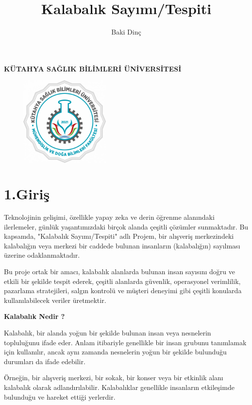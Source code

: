 \documentclass[10pt,a4paper]{report}
\title{Kalabalık Sayımı/Tespiti}
\author{Baki Dinç}
\begin{document}
	\textbf{KÜTAHYA SAĞLIK BİLİMLERİ ÜNİVERSİTESİ}\centering
	\begin{figure}[!h]
		\centering
		\includegraphics[width=170px, height=170px]{logomuh}
		\maketitle
	\end{figure}
	
		\newpage
		
			\raggedright\section*{1.Giriş}
		Teknolojinin gelişimi, özellikle yapay zeka ve derin öğrenme alanındaki ilerlemeler, günlük yaşantımızdaki birçok alanda çeşitli çözümler sunmaktadır. Bu kapsamda, "Kalabalık Sayımı/Tespiti" adlı Projem, bir alışveriş merkezindeki kalabalığın veya merkezi bir caddede bulunan insanların (kalabalığın) sayılması üzerine odaklanmaktadır.\newline
		
		
		
		Bu proje ortak bir amacı, kalabalık alanlarda bulunan insan sayısını doğru ve etkili bir şekilde tespit ederek, çeşitli alanlarda güvenlik, operasyonel verimlilik, pazarlama stratejileri, salgın kontrolü ve müşteri deneyimi gibi çeşitli konularda kullanılabilecek veriler üretmektir.\newline
		

	
	
	
	\vspace{1cm}
	
		\textbf{Kalabalık Nedir ?}
	\raggedright	Kalabalık, bir alanda yoğun bir şekilde bulunan insan veya nesnelerin topluluğunu ifade eder. Anlam itibariyle genellikle bir insan grubunu tanımlamak için kullanılır, ancak aynı zamanda nesnelerin yoğun bir şekilde bulunduğu durumları da ifade edebilir.
	
	Örneğin, bir alışveriş merkezi, bir sokak, bir konser veya bir etkinlik alanı kalabalık olarak adlandırılabilir. Kalabalıklar genellikle insanların etkileşimde bulunduğu ve hareket ettiği yerlerdir.\newline 
	
\end{document}
